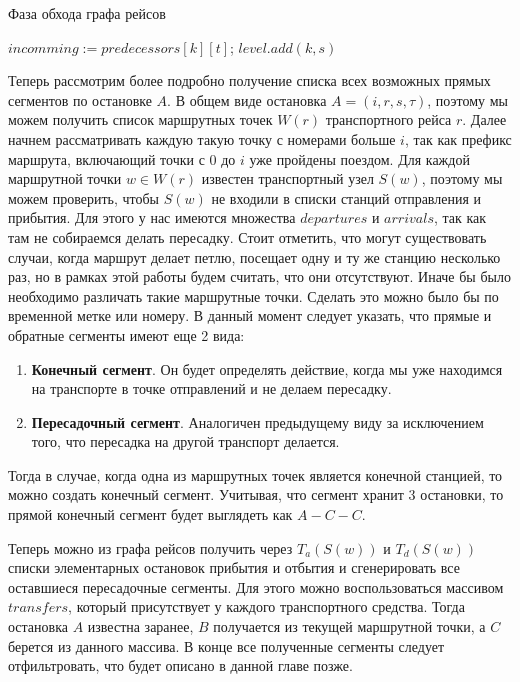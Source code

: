 \begin{algorithm}[!h]
	\caption{Фаза обхода графа рейсов}\label{lst5}
	\begin{algorithmic}
		\State $incomming := predecessors[k][t]$;
		\State $level.add(k, s)$
		\EndFor
		\EndFor
		\EndFunction
	\end{algorithmic}
\end{algorithm}

Теперь рассмотрим более подробно получение списка всех возможных прямых сегментов по остановке $A$. В общем виде остановка $A=(i, r, s, \tau)$, поэтому мы можем получить список маршрутных точек $W(r)$ транспортного рейса $r$. Далее начнем рассматривать каждую такую точку с номерами больше $i$, так как префикс маршрута, включающий точки с $0$ до $i$ уже пройдены поездом. Для каждой маршрутной точки $w \in W(r)$ известен транспортный узел $S(w)$, поэтому мы можем проверить, чтобы $S(w)$ не входили в списки станций отправления и прибытия. Для этого у нас имеются множества $departures$ и $arrivals$, так как там не собираемся делать пересадку. Стоит отметить, что могут существовать случаи, когда маршрут делает петлю, посещает одну и ту же станцию несколько раз, но в рамках этой работы будем считать, что они отсутствуют. Иначе бы было необходимо различать такие маршрутные точки. Сделать это можно было бы по временной метке или номеру. В данный момент следует указать, что прямые и обратные сегменты имеют еще 2 вида:
\begin{enumerate}
	\item \textbf{Конечный сегмент}. Он будет определять действие, когда мы уже находимся на транспорте в точке отправлений и не делаем пересадку.
	\item \textbf{Пересадочный сегмент}. Аналогичен предыдущему виду за исключением того, что пересадка на другой транспорт делается.
\end{enumerate}

Тогда в случае, когда одна из маршрутных точек является конечной станцией, то можно создать конечный сегмент. Учитывая, что сегмент хранит 3 остановки, то прямой конечный сегмент будет выглядеть как $A-C-C$.

Теперь можно из графа рейсов получить через $T_a(S(w))$ и $T_d(S(w))$ списки элементарных остановок прибытия и отбытия и сгенерировать все оставшиеся пересадочные сегменты. Для этого можно воспользоваться массивом $transfers$, который присутствует у каждого транспортного средства. Тогда остановка $A$ известна заранее, $B$ получается из текущей маршрутной точки, а $C$ берется из данного массива. В конце все полученные сегменты следует отфильтровать, что будет описано в данной главе позже.

